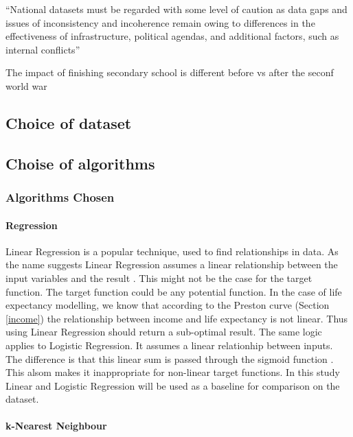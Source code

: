 \documentclass[12pt,a4paper]{article}
\begin{document}
``National datasets must be regarded with some level of caution as data gaps and issues of inconsistency and incoherence remain owing to differences in the effectiveness of infrastructure, political agendas, and additional factors, such as internal conflicts'' \cite{Bulled2010}  


The impact of finishing secondary school is different before vs after the seconf world war \cite{Deboosere2009}

\subsection{Choice of dataset}


\subsection{Choise of algorithms}

\subsubsection{Algorithms Chosen}
\paragraph{Regression}
Linear Regression is a popular technique, used to find relationships in data. As the name suggests Linear Regression assumes a linear relationship between the input variables and the result \citep{Murphy}. This might not be the case for the target function. The target function could be any potential function. In the case of life expectancy modelling, we know that according to the Preston curve (Section \ref{income}) the relationship between income and life expectancy is not linear. Thus using Linear Regression should return a sub-optimal result. The same logic applies to Logistic Regression. It assumes a linear relationhip between inputs. The difference is that this linear sum is passed through the sigmoid function \citep{Murphy}. This alsom makes it inappropriate for non-linear target functions. In this study Linear and Logistic Regression will be used as a baseline for comparison on the dataset.

\paragraph{k-Nearest Neighbour}
\end{document}
